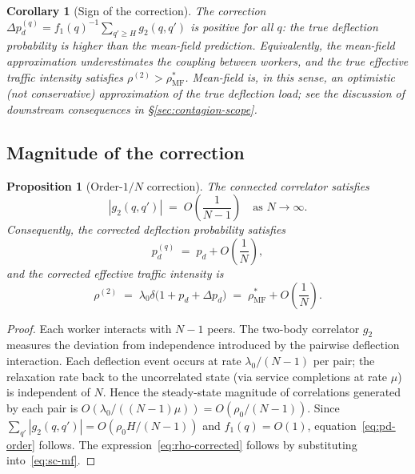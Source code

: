 \documentclass[11pt,a4paper]{article}
\newtheorem{proposition}[theorem]{Proposition}
\newtheorem{corollary}[theorem]{Corollary}
\newcommand{\abs}[1]{\left\lvert #1 \right\rvert}
\newcommand{\rhostar}{\rho^{*}}
\newcommand{\pd}{p_d}
\newcommand{\fone}{f_1}
\newcommand{\gtwo}{g_2}
\begin{document}
\begin{corollary}[Sign of the correction]
The correction $\Delta\pd^{(q)} = \fone(q)^{-1} \sum_{q' \geq H} \gtwo(q, q')$
is \emph{positive} for all $q$: the true deflection probability is
\emph{higher} than the mean-field prediction.
Equivalently, the mean-field approximation \emph{underestimates} the
coupling between workers, and the true effective traffic intensity
satisfies $\rho^{(2)} > \rhostar_{\mathrm{MF}}$. Mean-field is, in this
sense, an \emph{optimistic} (not conservative) approximation of the
true deflection load; see the discussion of downstream consequences in
\S\ref{sec:contagion-scope}.
\end{corollary}

\subsection{Magnitude of the correction}

\begin{proposition}[Order-$1/N$ correction]
\label{prop:1overN}
The connected correlator satisfies
\begin{equation}
  \abs{\gtwo(q, q')} \;=\; O\!\left(\frac{1}{N-1}\right)
  \quad \text{as } N \to \infty.
\end{equation}
Consequently, the corrected deflection probability satisfies
\begin{equation}
  \pd^{(q)} \;=\; \pd + O\!\left(\frac{1}{N}\right),
  \label{eq:pd-order}
\end{equation}
and the corrected effective traffic intensity is
\begin{equation}
  \rho^{(2)}
  \;=\; \lambda_0\delta\bigl(1 + \pd + \Delta\pd\bigr)
  \;=\; \rhostar_{\mathrm{MF}} + O\!\left(\frac{1}{N}\right).
  \label{eq:rho-corrected}
\end{equation}
\end{proposition}

\begin{proof}
Each worker interacts with $N-1$ peers.  The two-body correlator $\gtwo$
measures the deviation from independence introduced by the pairwise
deflection interaction.  Each deflection event occurs at rate
$\lambda_0/(N-1)$ per pair; the relaxation rate back to the uncorrelated
state (via service completions at rate $\mu$) is independent of $N$.
Hence the steady-state magnitude of correlations generated by each pair is
$O(\lambda_0/((N-1)\mu)) = O(\rho_0/(N-1))$.
Since $\sum_{q'} \abs{\gtwo(q, q')} = O(\rho_0 H / (N-1))$ and
$\fone(q) = O(1)$, equation~\eqref{eq:pd-order} follows.
The expression~\eqref{eq:rho-corrected} follows by substituting
into~\eqref{eq:sc-mf}.
\end{proof}
\end{document}

